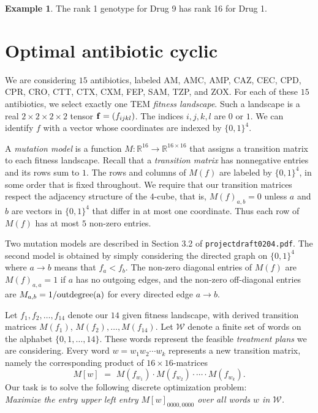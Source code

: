 \documentclass[12pt]{amsart}
\theoremstyle{plain}
\theoremstyle{definition}
\newtheorem{example}[theorem]{Example}
\newcommand{\R}{{\mathbb R}}
\begin{document}
{\begin{example}
The rank 1 genotype for Drug 9 has rank 16 for Drug 1.
\end{example}




\section{Optimal antibiotic cyclic}

We are considering $15$ antibiotics, labeled
AM, AMC, AMP, CAZ, CEC, CPD, CPR, CRO, CTT, CTX, CXM, FEP, SAM, TZP,
and ZOX. For each of these $15$ antibiotics, we select exactly one TEM 
{\em fitness landscape}.
Such a landscape  is a real $2 {\times} 2 {\times} 2 {\times} 2$ tensor 
${\bf f} = (f_{ijkl})$. The indices $i,j,k,l$ are $0$ or $1$.
We can identify $f$ with a vector whose coordinates
are indexed by $\{0,1\}^4$.

A {\em mutation model} is a function $M : \R^{16} \rightarrow \R^{16 \times 16}$
that assigns a transition matrix to each fitness landscape.
Recall that a {\em transition matrix} has nonnegative entries
and its rows sum to $1$. The rows and columns of
$M(f)$ are labeled by $\{0,1\}^4$, in some order
that is fixed throughout.
We require that our transition matrices respect the adjacency structure
of the $4$-cube, that is, $M(f)_{a,b} = 0$
unless $a$ and $b$ are vectors in $\{0,1\}^4$ that differ in at most one coordinate.
Thus each row of $M(f)$ has at most $5$ non-zero entries.

Two mutation models are described in Section 3.2 of {\tt projectdraft0204.pdf}.
The second model is obtained by simply considering the
directed graph on $\{0,1\}^4$ where $a \rightarrow b$ means
that $f_a < f_b$. The non-zero diagonal entries of $M(f)$ are
  $M(f)_{a,a} = 1$ if $a$ has no outgoing edges, 
  and the non-zero off-diagonal entries are
$M_{a,b} = 1/\hbox{outdegree(a)}$ for every directed edge $a \rightarrow b$.

Let $f_1,f_2,\ldots,f_{14}$ denote our $14$ given fitness landscape,
with derived transition matrices
 $M(f_1)$, $M(f_2),\ldots, M(f_{14})$.
 Let $\mathcal{W}$ denote a finite set of
 words on the alphabet $\{0,1,\ldots,14\}$.
 These words represent the feasible {\em treatment plans} we are considering.
 Every word $w = w_1 w_2 \cdots w_k$ represents a new transition matrix,
 namely the corresponding
  product of $16 {\times} 16$-matrices
 $$ M[w] \,\, = \,\, M(f_{w_1}) \cdot M(f_{w_2}) \cdot \cdots \cdot M(f_{w_k}).$$
Our task is to solve the following discrete optimization problem: \\
{\em
Maximize the entry upper left entry $M[w]_{0000,0000}$
over all words $w$ in $\mathcal{W}$. }

}
\end{document}
